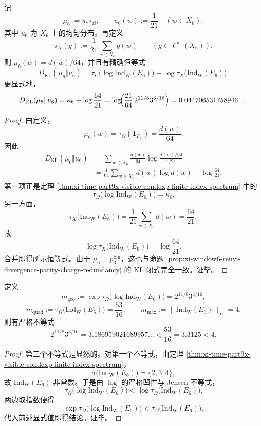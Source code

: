 \begin{theorem}[指数元的相对熵恒等式]\label{thm:xi-time-part9x-index-relative-entropy-identity}
记
\[
\mu_6:=\pi_\ast \tau_\Omega,
\qquad
u_6(w):=\frac{1}{21}
\quad (w\in X_6),
\]
其中 \(u_6\) 为 \(X_6\) 上的均匀分布。再定义
\[
\tau_X(g):=\frac{1}{21}\sum_{w\in X_6}g(w)
\qquad (g\in \ell^\infty(X_6)).
\]
则 \(\mu_6(w)=d(w)/64\)，并且有精确恒等式
\[
D_{\mathrm{KL}}(\mu_6\Vert u_6)
=
\tau_\Omega\!\bigl(\log \mathrm{Ind}_{\mathrm W}(E_6)\bigr)
-\log \tau_X\!\bigl(\mathrm{Ind}_{\mathrm W}(E_6)\bigr).
\]
更显式地，
\[
D_{\mathrm{KL}}(\mu_6\Vert u_6)
=
\kappa_6-\log\frac{64}{21}
=
\log\!\Bigl(\frac{21}{64}\,2^{11/8}3^{3/16}\Bigr)
=
0.044706531758946\ldots
\]
\end{theorem}
\begin{proof}
由定义，
\[
\mu_6(w)=\tau_\Omega(\mathbf 1_{F_w})=\frac{d(w)}{64}.
\]
因此
\[
\begin{aligned}
D_{\mathrm{KL}}(\mu_6\Vert u_6)
&=
\sum_{w\in X_6}\frac{d(w)}{64}
\log\frac{d(w)/64}{1/21}\\
&=
\frac{1}{64}\sum_{w\in X_6}d(w)\log d(w)-\log\frac{64}{21}.
\end{aligned}
\]
第一项正是定理 \ref{thm:xi-time-part9x-visible-condexp-finite-index-spectrum} 中的
\[
\tau_\Omega\!\bigl(\log \mathrm{Ind}_{\mathrm W}(E_6)\bigr)=\kappa_6.
\]
另一方面，
\[
\tau_X\!\bigl(\mathrm{Ind}_{\mathrm W}(E_6)\bigr)
=
\frac{1}{21}\sum_{w\in X_6}d(w)
=
\frac{64}{21},
\]
故
\[
\log \tau_X\!\bigl(\mathrm{Ind}_{\mathrm W}(E_6)\bigr)=\log\frac{64}{21}.
\]
合并即得所示恒等式。由于 \(\mu_6=p_6^{\mathrm{bin}}\)，这也与命题
\ref{prop:xi-window6-renyi-divergence-parity-charge-redundancy} 的 KL 闭式完全一致。证毕。
\end{proof}

\begin{corollary}\label{cor:xi-time-part9x-hidden-multiplicity-three-means-separation}
定义
\[
m_{\mathrm{geo}}
:=
\exp \tau_\Omega\!\bigl(\log \mathrm{Ind}_{\mathrm W}(E_6)\bigr)
=
2^{11/8}3^{3/16},
\]
\[
m_{\mathrm{quad}}
:=
\tau_\Omega\!\bigl(\mathrm{Ind}_{\mathrm W}(E_6)\bigr)
=
\frac{53}{16},
\qquad
m_{\max}:=\bigl\|\mathrm{Ind}_{\mathrm W}(E_6)\bigr\|_\infty=4.
\]
则有严格不等式
\[
2^{11/8}3^{3/16}
=
3.186959021689957\ldots
<
\frac{53}{16}
=
3.3125
<
4.
\]
\end{corollary}
\begin{proof}
第二个不等式是显然的。对第一个不等式，由定理
\ref{thm:xi-time-part9x-visible-condexp-finite-index-spectrum}，
\[
\sigma\!\bigl(\mathrm{Ind}_{\mathrm W}(E_6)\bigr)=\{2,3,4\},
\]
故 \(\mathrm{Ind}_{\mathrm W}(E_6)\) 非常数。于是由 \(\log\) 的严格凹性与 Jensen 不等式，
\[
\tau_\Omega\!\bigl(\log \mathrm{Ind}_{\mathrm W}(E_6)\bigr)
<
\log \tau_\Omega\!\bigl(\mathrm{Ind}_{\mathrm W}(E_6)\bigr).
\]
两边取指数便得
\[
\exp \tau_\Omega\!\bigl(\log \mathrm{Ind}_{\mathrm W}(E_6)\bigr)
<
\tau_\Omega\!\bigl(\mathrm{Ind}_{\mathrm W}(E_6)\bigr).
\]
代入前述显式值即得结论。证毕。
\end{proof}

